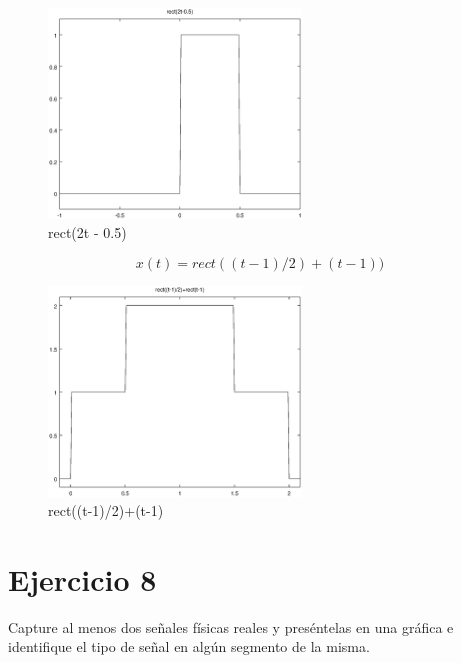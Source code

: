 \documentclass[10pt,a4paper]{report}
\begin{document}
\begin{figure}[H]
\centering
\includegraphics[width=0.6\textwidth]{rectA}
\caption{rect(2t - 0.5)}
\label{fig:rectA}
\end{figure}

\begin{equation*}
x(t)=rect((t-1)/2)+(t-1))
\end{equation*}

\begin{figure}[H]
\centering
\includegraphics[width=0.6\textwidth]{rectB}
\caption{rect((t-1)/2)+(t-1)}
\label{fig:rectB}
\end{figure}








\section{Ejercicio 8}
Capture al menos dos señales físicas reales y preséntelas en una  gráfica e identifique el tipo de señal en algún segmento de la misma.\\
\end{document}
